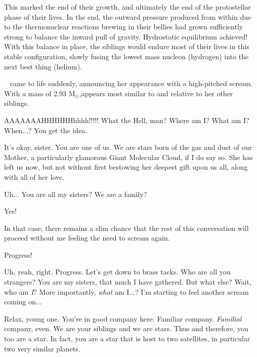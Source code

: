 \documentclass[main.tex]{subfiles}
\begin{document}
\par \nar This marked the end of their growth, and ultimately the end of the protostellar phase of their lives.  In the end, the outward pressure produced from within due to the thermonuclear reactions brewing in their bellies had grown sufficiently strong to balance the inward pull of gravity.  Hydrostatic equilibrium achieved!  With this balance in place, the siblings would endure most of their lives in this stable configuration, slowly fusing the lowest mass nucleon (hydrogen) into the next best thing (helium).

\par \nar \rmsterope~ came to life suddenly, announcing her appearance with a high-pitched scream.  With a mass of 2.93 M$_{\odot}$,\rmsterope appears most similar to \rmtaygete and \rmalcyone relative to her other siblings.

\par \Sterope AAAAAAAHHHHHHhhhh!!!!!  What the Hell, man?  Where am I?  What am I?  When...?  You get the idea.

\par \Maia It's okay, sister.  You are one of us.  We are stars born of the gas and dust of our Mother, a particularly glamorous Giant Molecular Cloud, if I do say so.  She has left us now, but not without first bestowing her deepest gift upon us all, along with all of her love.

\par \Sterope  Uh... You are all my sisters?  We are a family?

\par \Maia Yes!

\par \Sterope  In that case, there remains a slim chance that the rest of this conversation will proceed without me feeling the need to scream again.

\par \Maia Progress!

\par \Sterope Uh, yeah, right.  Progress.  Let's get down to brass tacks.  Who are all you strangers?  You are my sisters, that much I have gathered.  But what else?  Wait, who am \textit{I}?  More importantly, \textit{what} am I...?  I'm starting to feel another scream coming on...

\par \Maia Relax, young one.  You're in good company here.  Familiar company.  \textit{Familial} company, even. We are your siblings and we are stars.  Thus and therefore, you too are a star.  In fact, you are a star that is host to two satellites, in particular two very similar planets. 
\end{document}
